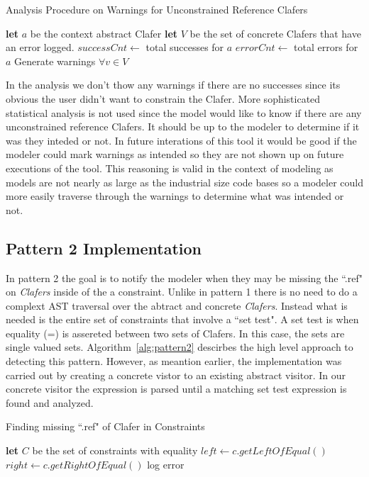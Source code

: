 \documentclass[10pt,oneside]{IEEEtran}
\begin{document}
\begin{algorithm}[H]
\caption{Analysis Procedure on Warnings for Unconstrained Reference Clafers}\label{alg:pattern1Stats}
\begin{algorithmic}[1]
  \State \textbf{let} $a$ be the context abstract Clafer
  \State \textbf{let} $V$ be the set of concrete Clafers that have an error logged.
  \State $successCnt \gets $ total successes for $a$
  \State $errorCnt \gets $ total errors for $a$
    \State Generate warnings $\forall v \in V$
  \EndIf
\EndProcedure
\end{algorithmic}
\end{algorithm}

In the analysis we don't thow any warnings if there are no successes since its obvious the user didn't want to constrain the Clafer. More sophisticated statistical analysis is not used since the model would like to know if there are any unconstrained reference Clafers. It should be up to the modeler to determine if it was they inteded or not. In future interations of this tool it would be good if the modeler could mark warnings as intended so they are not shown up on future executions of the tool. This reasoning is valid in the context of modeling as models are not nearly as large as the industrial size code bases so a modeler could more easily traverse through the warnings to determine what was intended or not.

\subsection{Pattern 2 Implementation}
In pattern 2 the goal is to notify the modeler when they may be missing the ``.ref" on  \textit{Clafers} inside of the a constraint. Unlike in pattern 1 there is no need to do a complext AST traversal over the abtract and concrete \textit{Clafers}. Instead what is needed is the entire set of constraints that involve a ``set test". A set test is when equality (=) is assereted between two sets of Clafers. In this case, the sets are single valued sets. Algorithm~\ref{alg:pattern2} descirbes the high level approach to detecting this pattern. However, as meantion earlier, the implementation was carried out by creating a concrete vistor to an existing abstract visitor. In our concrete visitor the expression is parsed until a matching set test expression is found and analyzed.

\begin{algorithm}[H]
\caption{Finding missing ``.ref" of Clafer in Constraints}\label{alg:pattern2}
\begin{algorithmic}[1]
  \State \textbf{let} $C$ be the set of constraints with equality
    \State $left \gets c.getLeftOfEqual()$
    \State $right \gets c.getRightOfEqual()$
        \State log error
      \EndIf
    \EndIf
  \EndFor
\EndProcedure
\end{algorithmic}
\end{algorithm}
\end{document}
